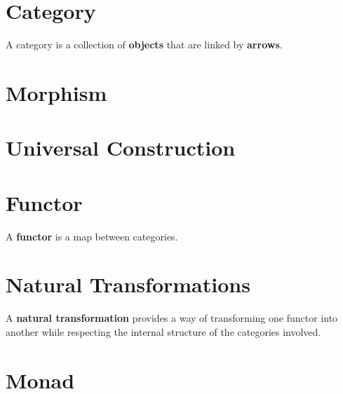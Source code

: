\documentclass{article}
\begin{document}
\section{Category}
A category is a collection of \textbf{objects} that are linked by \textbf{arrows}.

\section{Morphism}

\section{Universal Construction}

\section{Functor}
A \textbf{functor} is a map between categories.

\section{Natural Transformations}
A \textbf{natural transformation} provides a way of transforming one functor 
into another while respecting the internal structure of the categories involved.

\section{Monad}
\end{document}
